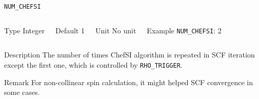 \begin{frame}[allowframebreaks]{\texttt{NUM\_CHEFSI}} \label{NUM_CHEFSI}
\vspace*{-12pt}
\begin{columns}
\begin{block}{Type}
Integer
\end{block}

\begin{block}{Default}
1
\end{block}

\begin{block}{Unit}
No unit
\end{block}

\begin{block}{Example}
\texttt{NUM\_CHEFSI}: 2
\end{block}
\end{columns}

\begin{block}{Description}
The number of times ChefSI algorithm is repeated in SCF iteration except the first one, which is controlled by \texttt{RHO\_TRIGGER}.
\end{block}

\begin{block}{Remark}
For non-collinear spin calculation, it might helped SCF convergence in some cases. 
\end{block}

\end{frame}


